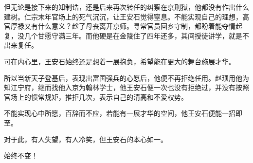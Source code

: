 但无论是接下来的知制诰，还是后来再次转任的纠察在京刑狱，他都没有作出什么建树。仁宗末年官场上的死气沉沉，让王安石觉得窒息。不能实现自己的理想，高官厚禄又有什么意义？趁了母丧离开京师。寻常官员回乡守制，都盼着能夺情起复，没几个甘愿守满三年。而他硬是在金陵住了四年还多，其间授徒讲学，就是不出来复任。

可在内心里，王安石始终还是想着一展抱负，希望能在更大的舞台施展才华。

所以当新天子登基后，表现出富国强兵的心愿后，他便不再拒绝任用。赵顼用他为知江宁府，继而找他入京为翰林学士，他王安石便一次也没有拒绝过，并没有按照官场上的惯常规矩，推拒几次，表示自己的清高和不爱权势。

不能实现心中所愿，百辞而不应，若能有一展才华的空间，他王安石便能一招即至。

对于此，有人失望，有人冷笑，但王安石的本心如一。

始终不变！

